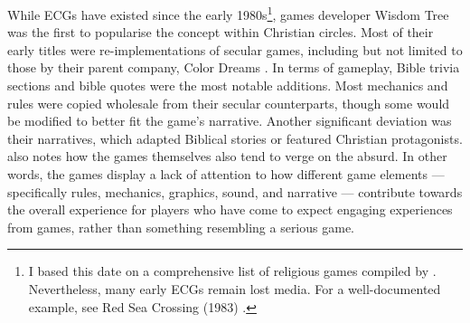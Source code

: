 While \acp{ECG} have existed since the early 1980s\footnote{I based this date on a comprehensive list of religious games compiled by \textcite{gonzalez_religious_2022}. Nevertheless, many early \acp{ECG} remain lost media. For a well-documented example, see Red Sea Crossing (1983) \parencite{lucky_chorus_2023, goldfarb_holy_2012}.}, games developer Wisdom Tree was the first to popularise the concept within Christian circles. Most of their early titles were re-implementations of secular games, including but not limited to those by their parent company, Color Dreams \parencite[287]{bogost_persuasive_2007}. In terms of gameplay, Bible trivia sections and bible quotes were the most notable additions. Most mechanics and rules were copied wholesale from their secular counterparts, though some would be modified to better fit the game's narrative. Another significant deviation was their narratives, which adapted Biblical stories or featured Christian protagonists. \textcite[287]{bogost_persuasive_2007} also notes how the games themselves also tend to verge on the absurd. In other words, the games display a lack of attention to how different game elements --- specifically rules, mechanics, graphics, sound, and narrative --- contribute towards the overall experience for players who have come to expect engaging experiences from games, rather than something resembling a serious game.





